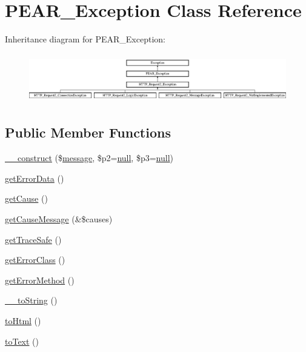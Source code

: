 \hypertarget{classPEAR__Exception}{}\section{P\+E\+A\+R\+\_\+\+Exception Class Reference}
\label{classPEAR__Exception}
Inheritance diagram for P\+E\+A\+R\+\_\+\+Exception\+:\begin{figure}[H]
\begin{center}
\leavevmode
\includegraphics[height=2.162162cm]{classPEAR__Exception}
\end{center}
\end{figure}
\subsection*{Public Member Functions}
\begin{DoxyCompactItemize}
\item 
\hyperlink{classPEAR__Exception_a7cecb146f11821bcd31ef8317c9a2ce9}{\+\_\+\+\_\+construct} (\$\hyperlink{classmessage}{message}, \$p2=\hyperlink{modernizr_8min_8js_a286f9ec831c5e676eeb493248eab9575}{null}, \$p3=\hyperlink{modernizr_8min_8js_a286f9ec831c5e676eeb493248eab9575}{null})
\item 
\hyperlink{classPEAR__Exception_a705ea5e6f32355245137f979221bf5c2}{get\+Error\+Data} ()
\item 
\hyperlink{classPEAR__Exception_abc2aa18bf5cf14ab29e01d14eed7e041}{get\+Cause} ()
\item 
\hyperlink{classPEAR__Exception_a1c16ee57f4091d424c1bbcd904dda4f4}{get\+Cause\+Message} (\&\$causes)
\item 
\hyperlink{classPEAR__Exception_a6ddfe3065ec2af986b3e3fe267198515}{get\+Trace\+Safe} ()
\item 
\hyperlink{classPEAR__Exception_a747dd232565b7e07ec7ef55e46405f4e}{get\+Error\+Class} ()
\item 
\hyperlink{classPEAR__Exception_a423d0dcd3d908d2a39068a0893d17f22}{get\+Error\+Method} ()
\item 
\hyperlink{classPEAR__Exception_ab02a3b6f2be2f5b639cba45b007f7b7a}{\+\_\+\+\_\+to\+String} ()
\item 
\hyperlink{classPEAR__Exception_ab69d689242e40974b2675cf25aa68068}{to\+Html} ()
\item 
\hyperlink{classPEAR__Exception_ad3b5a0285226613b02b1730b2d632bd1}{to\+Text} ()
\end{DoxyCompactItemize}
